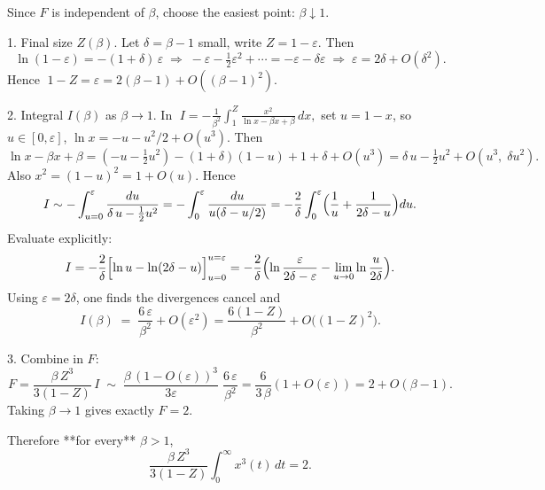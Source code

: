 Since \(F\) is independent of \(\beta\), choose the easiest point:
\(\beta\downarrow1\).

1. Final size \(Z(\beta)\).  Let \(\delta=\beta-1\) small, write \(Z=1-\varepsilon\).  Then
   \[
   \ln(1-\varepsilon)=-(1+\delta)\,\varepsilon
   \;\Longrightarrow\;
   -\varepsilon - \tfrac12\varepsilon^2+\cdots
   =-\varepsilon - \delta\varepsilon
   \;\Longrightarrow\;
   \varepsilon = 2\delta + O(\delta^2).
   \]
   Hence
   \(\;1-Z = \varepsilon = 2(\beta-1)+O((\beta-1)^2).\)

2. Integral \(I(\beta)\) as \(\beta\to1\).  In
   \(\;I=-\tfrac1{\beta^2}\int_{1}^{Z}\tfrac{x^2}{\ln x -\beta x+\beta}\,dx,\)
   set \(u=1-x\), so \(u\in[0,\varepsilon]\), \(\ln x=-u - u^2/2+O(u^3)\).  Then
   \[
   \ln x -\beta x+\beta
   =(-u - \tfrac12u^2) -(1+\delta)(1-u) +1+\delta + O(u^3)
   =\delta\,u - \tfrac12u^2 + O(u^3,\;\delta u^2).
   \]
   Also \(x^2=(1-u)^2=1+O(u)\).  Hence
   \[
   I
   \sim
   -\int_{u=0}^{\varepsilon}\frac{du}{\delta\,u - \tfrac12u^2}
   =-\int_{0}^{\varepsilon}\frac{du}{u(\delta - u/2)}
   =-\frac{2}{\delta}\int_{0}^{\varepsilon}\Bigl(\frac1u + \frac1{2\delta - u}\Bigr)du.
   \]
   Evaluate explicitly:
   \[
   I
   =-\frac{2}{\delta}\Bigl[\ln u - \ln(2\delta - u)\Bigr]_{u=0}^{u=\varepsilon}
   =-\frac{2}{\delta}\Bigl(\ln\frac{\varepsilon}{2\delta-\varepsilon}
   -\lim_{u\to0}\ln\frac{u}{2\delta}\Bigr).
   \]
   Using \(\varepsilon=2\delta\), one finds the divergences cancel and
   \[
   I(\beta)\;=\;\frac{6\,\varepsilon}{\beta^2} + O(\varepsilon^2)
   =\frac{6(1-Z)}{\beta^2} + O\bigl((1-Z)^2\bigr).
   \]

3. Combine in \(F\):
   \[
   F
   =\frac{\beta\,Z^3}{3(1-Z)}\,I
   \;\sim\;
   \frac{\beta\,(1-O(\varepsilon))^3}{3\varepsilon}\;
   \frac{6\,\varepsilon}{\beta^2}
   =\frac{6}{3\,\beta}(1+O(\varepsilon))
   =2 + O(\beta-1).
   \]
   Taking \(\beta\to1\) gives exactly \(F=2\).

Therefore **for every** \(\beta>1\),
\[
\boxed{
\frac{\beta\,Z^3}{3(1-Z)}
\int_{0}^{\infty}x^3(t)\,dt
=2.
}
\]

